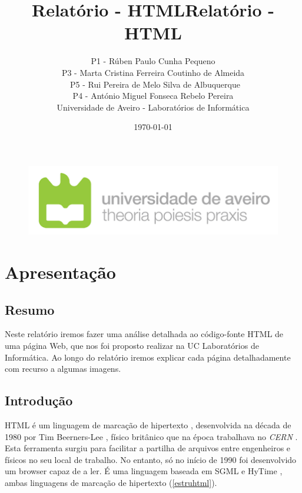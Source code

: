 \documentclass[11pt,openright,twoside]{report}
\title{\textbf{Relatório - HTML}}
\begin{document}
\begin{titlepage}
\begin{figure}
\title{\textbf{Relatório - HTML}}
\author{P1 - Rúben Paulo Cunha Pequeno\\
P3 - Marta Cristina Ferreira Coutinho de Almeida\\\
P5 - Rui Pereira de Melo Silva de Albuquerque\\
P4 - António Miguel Fonseca Rebelo Pereira\\\vspace{3cm}
Universidade de Aveiro - Laboratórios de Informática}
\date{\today}
 \includegraphics[scale=0.9]{ua_logo.png}
\end{figure}
\end{titlepage}

\maketitle
\tableofcontents
\listoffigures

\part{Apresentação}

\chapter{Resumo}
Neste relatório iremos fazer uma análise detalhada ao código-fonte HTML de uma página Web, que nos foi proposto realizar na UC Laboratórios de Informática. Ao longo do relatório iremos explicar cada página detalhadamente com recurso a algumas imagens.
\smallskip


\chapter{Introdução}
HTML é um linguagem de marcação de hipertexto \cite{markup}, desenvolvida na década de 1980 por Tim Beerners-Lee \cite{HTML}, físico britânico que na época trabalhava no \textit{CERN} \cite{CERN}. Esta ferramenta surgiu para facilitar a partilha de arquivos entre engenheiros e físicos no seu local de trabalho. No entanto, só no início de 1990 foi desenvolvido um browser capaz de a ler. É uma linguagem baseada em SGML \cite{SGML} e HyTime \cite{HyTime}, ambas linguagens de marcação de hipertexto (\autoref{estruhtml}).
\smallskip
\end{document}
